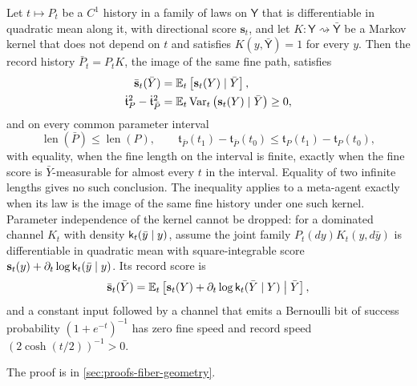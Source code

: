 Let $t\mapsto P_t$ be a $C^1$ history in a family of laws on $\mathsf Y$ that is
differentiable in quadratic mean along it, with directional score $\mathbf s_t$, and let
$K:\mathsf Y\rightsquigarrow\bar{\mathsf Y}$ be a Markov kernel that does not depend on
$t$ and satisfies $K(y,\bar{\mathsf Y})=1$ for every $y$.  Then the record history
$\bar P_t=P_tK$, the image of the same fine path, satisfies
\begin{align}
\bar{\mathbf s}_t(\bar Y)
&=\mathbb E_t\left[\mathbf s_t(Y)\mid\bar Y\right],
\label{eq:hist-record-score-projection}\\
\dot{\mathfrak t}_{P}^2-\dot{\mathfrak t}_{\bar P}^2
&=\mathbb E_t\operatorname{Var}_t\left(\mathbf s_t(Y)\mid\bar Y\right)
\geq0,
\label{eq:hist-record-conditional-variance-defect}
\end{align}
and on every common parameter interval
\begin{equation}
\operatorname{len}(\bar P)\leq\operatorname{len}(P),
\qquad
\mathfrak t_{\bar P}(t_1)-\mathfrak t_{\bar P}(t_0)
\leq
\mathfrak t_{P}(t_1)-\mathfrak t_{P}(t_0),
\label{eq:hist-record-clock-contraction}
\end{equation}
with equality, when the fine length on the interval is finite, exactly when the fine
score is $\bar Y$-measurable for almost every $t$ in the interval. Equality of two
infinite lengths gives no such conclusion. The inequality applies to a meta-agent exactly when its law is the image
of the same fine history under one such kernel.  Parameter independence of the kernel
cannot be dropped: for a dominated channel $K_t$ with density
$\mathsf k_t(\bar y\mid y)$, assume the joint family $P_t(dy)K_t(y,d\bar y)$ is
differentiable in quadratic mean with square-integrable score
$\mathbf s_t(y)+\partial_t\log\mathsf k_t(\bar y\mid y)$. Its record score is
\begin{equation}
\bar{\mathbf s}_t(\bar Y)
=\mathbb E_t\left[
\mathbf s_t(Y)
+\partial_t\log\mathsf k_t(\bar Y\mid Y)
\mathrel{\big|}\bar Y
\right],
\label{eq:hist-parameter-dependent-channel-score}
\end{equation}
and a constant input followed by a channel that emits a Bernoulli bit of success
probability $(1+e^{-t})^{-1}$ has zero fine speed and record speed
$(2\cosh(t/2))^{-1}>0$.  

The proof is in \cref{sec:proofs-fiber-geometry}.

